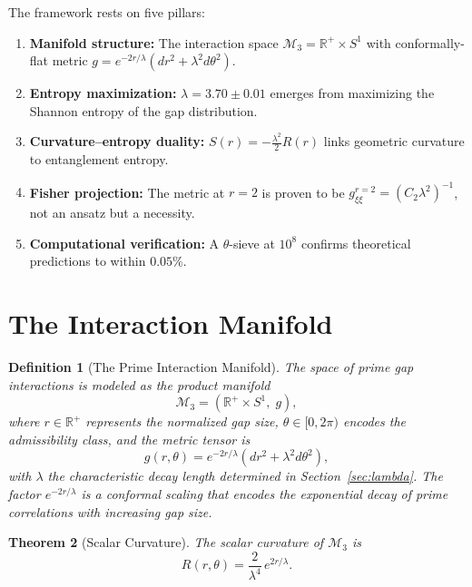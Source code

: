 \documentclass[12pt]{article}
\newtheorem{theorem}{Theorem}[section]
\newtheorem{definition}[theorem]{Definition}
\begin{document}
The framework rests on five pillars:

\begin{enumerate}
  \item \textbf{Manifold structure:} The interaction space $\mathcal{M}_3 = \mathbb{R}^+ \times S^1$
    with conformally-flat metric $g = e^{-2r/\lambda}(dr^2 + \lambda^2 d\theta^2)$.
  \item \textbf{Entropy maximization:} $\lambda = 3.70 \pm 0.01$ emerges from maximizing
    the Shannon entropy of the gap distribution.
  \item \textbf{Curvature--entropy duality:} $S(r) = -\frac{\lambda^2}{2} R(r)$ links
    geometric curvature to entanglement entropy.
  \item \textbf{Fisher projection:} The metric at $r=2$ is proven to be
    $g_{\xi\xi}^{r=2} = (C_2 \lambda^2)^{-1}$, not an ansatz but a necessity.
  \item \textbf{Computational verification:} A $\theta$-sieve at $10^8$ confirms
    theoretical predictions to within $0.05\%$.
\end{enumerate}

\section{The Interaction Manifold}

\begin{definition}[The Prime Interaction Manifold]
The space of prime gap interactions is modeled as the product manifold
\[
  \mathcal{M}_3 = \left(\mathbb{R}^+ \times S^1,\; g\right),
\]
where $r \in \mathbb{R}^+$ represents the normalized gap size,
$\theta \in [0, 2\pi)$ encodes the admissibility class, and the metric tensor is
\begin{equation}
  g(r,\theta) = e^{-2r/\lambda}\left(dr^2 + \lambda^2 d\theta^2\right),
  \label{eq:metric}
\end{equation}
with $\lambda$ the characteristic decay length determined in Section~\ref{sec:lambda}.
The factor $e^{-2r/\lambda}$ is a conformal scaling that encodes the exponential
decay of prime correlations with increasing gap size.
\end{definition}

\begin{theorem}[Scalar Curvature]
The scalar curvature of $\mathcal{M}_3$ is
\begin{equation}
  R(r,\theta) = \frac{2}{\lambda^4}\, e^{2r/\lambda}.
  \label{eq:curvature}
\end{equation}
\end{theorem}
\end{document}
